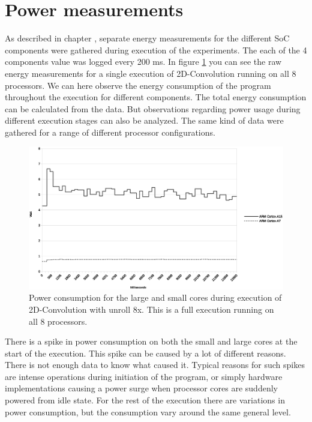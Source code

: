 \section{Power measurements}
As described in chapter , separate energy measurements for the different SoC components were gathered during execution of the experiments.
The each of the 4 components value was logged every 200 ms.
In figure \ref{powerovertime} you can see the raw energy measurements for a single execution of 2D-Convolution running on all 8 processors.
We can here observe the energy consumption of the program throughout the execution for different components.
The total energy consumption can be calculated from the data.
But observations regarding power usage during different execution stages can also be analyzed.
The same kind of data were gathered for a range of different processor configurations.

\begin{figure}[H]
  \centering
  \includegraphics[width=160mm]{fig/power-over-time.eps}
  \caption{Power consumption for the large and small cores during execution of 2D-Convolution with unroll 8x. This is a full execution running on all 8 processors. \label{overflow}}\label{powerovertime}
\end{figure}
There is a spike in power consumption on both the small and large cores at the start of the execution.
This spike can be caused by a lot of different reasons.
There is not enough data to know what caused it.
Typical reasons for such spikes are intense operations during initiation of the program, or simply hardware implementations causing a power surge when processor cores are suddenly powered from idle state.
For the rest of the execution there are variations in power consumption, but the consumption vary around the same general level.

